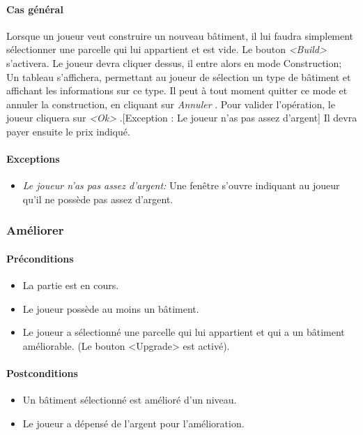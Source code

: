\documentclass[a4paper,11pt]{report}
\begin{document}
\paragraph{Cas général}
Lorsque un joueur veut construire un nouveau bâtiment, il lui faudra simplement sélectionner une parcelle qui lui appartient et est vide. Le bouton \og \textit{<Build>} \fg s'activera. Le joueur devra cliquer dessus, il entre alors en mode Construction; Un tableau s'affichera, permettant au joueur de sélection un type de bâtiment et affichant les informations sur ce type. Il peut à tout moment quitter ce mode et annuler la construction, en cliquant sur \og \textit{Annuler} \fg. Pour valider l'opération, le joueur cliquera sur \og \textit{<Ok>} \fg.[Exception : Le joueur n'as pas assez d'argent] Il devra payer ensuite le prix indiqué.
\paragraph{Exceptions}
\begin{itemize}
 \item \textit{Le joueur n'as pas assez d'argent:}  Une fenêtre s'ouvre indiquant au joueur qu'il ne possède pas assez d'argent.
\end{itemize}
\subsubsection{Améliorer}
\paragraph{Préconditions}
\begin{itemize}
 \item La partie est en cours.
 \item Le joueur possède au moins un bâtiment.
 \item Le joueur a sélectionné une parcelle qui lui appartient et qui a un bâtiment améliorable. (Le bouton <Upgrade> est activé).
\end{itemize}
\paragraph{Postconditions}
\begin{itemize}
 \item Un bâtiment sélectionné est amélioré d'un niveau.
 \item Le joueur a dépensé de l'argent pour l'amélioration.
\end{itemize}
\end{document}
